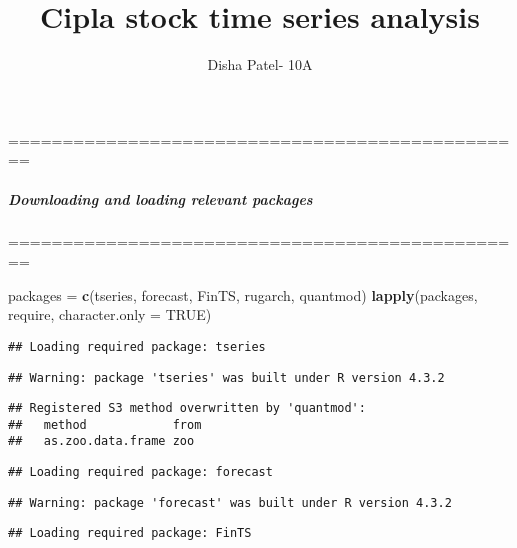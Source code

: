 \documentclass[
]{article}
\title{Cipla stock time series analysis}
\author{Disha Patel- 10A}
\date{}
\newenvironment{Shaded}{\begin{snugshade}}{\end{snugshade}}
\newcommand{\AttributeTok}[1]{\textcolor[rgb]{0.13,0.29,0.53}{#1}}
\newcommand{\ConstantTok}[1]{\textcolor[rgb]{0.56,0.35,0.01}{#1}}
\newcommand{\FunctionTok}[1]{\textcolor[rgb]{0.13,0.29,0.53}{\textbf{#1}}}
\newcommand{\NormalTok}[1]{#1}
\newcommand{\OtherTok}[1]{\textcolor[rgb]{0.56,0.35,0.01}{#1}}
\newcommand{\StringTok}[1]{\textcolor[rgb]{0.31,0.60,0.02}{#1}}
\begin{document}
\maketitle

================================================

\hypertarget{downloading-and-loading-relevant-packages}{%
\subparagraph{\texorpdfstring{\textbf{Downloading and loading relevant
packages}}{Downloading and loading relevant packages}}\label{downloading-and-loading-relevant-packages}}

================================================

\begin{Shaded}
\begin{Highlighting}[]
\NormalTok{packages }\OtherTok{=} \FunctionTok{c}\NormalTok{(}\StringTok{\textquotesingle{}tseries\textquotesingle{}}\NormalTok{, }\StringTok{\textquotesingle{}forecast\textquotesingle{}}\NormalTok{, }\StringTok{\textquotesingle{}FinTS\textquotesingle{}}\NormalTok{, }\StringTok{\textquotesingle{}rugarch\textquotesingle{}}\NormalTok{, }\StringTok{\textquotesingle{}quantmod\textquotesingle{}}\NormalTok{)}
\FunctionTok{lapply}\NormalTok{(packages, require, }\AttributeTok{character.only =} \ConstantTok{TRUE}\NormalTok{)}
\end{Highlighting}
\end{Shaded}

\begin{verbatim}
## Loading required package: tseries
\end{verbatim}

\begin{verbatim}
## Warning: package 'tseries' was built under R version 4.3.2
\end{verbatim}

\begin{verbatim}
## Registered S3 method overwritten by 'quantmod':
##   method            from
##   as.zoo.data.frame zoo
\end{verbatim}

\begin{verbatim}
## Loading required package: forecast
\end{verbatim}

\begin{verbatim}
## Warning: package 'forecast' was built under R version 4.3.2
\end{verbatim}

\begin{verbatim}
## Loading required package: FinTS
\end{verbatim}
\end{document}
